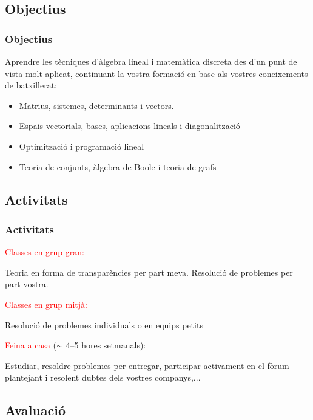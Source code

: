 \documentclass[12pt,t]{beamer}
\newcommand{\red}[1]{\textcolor{red}{#1}}
\theoremstyle{plain}
\theoremstyle{definition}
\begin{document}
\subsection{Objectius}
\begin{frame}
\frametitle{Objectius}
\medskip

Aprendre les tècniques d'àlgebra lineal i matemàtica discreta des d'un punt de vista molt aplicat, continuant la vostra formació  en base als vostres coneixements de batxillerat:
\medskip

\begin{itemize}
\item Matrius, sistemes, determinants i vectors.
\item Espais vectorials, bases, aplicacions lineals i diagonalització
\item Optimització i programació lineal
\item Teoria de conjunts, àlgebra de Boole i teoria de grafs 

\end{itemize}

\end{frame}

\subsection{Activitats}
\begin{frame}
\frametitle{Activitats}

\red{Classes en grup gran:}
\smallskip

Teoria en forma de transparències per part meva. Resolució de problemes per part vostra.\bigskip
\pause

\red{Classes en grup mitjà:}
\smallskip

Resolució de problemes individuals o en equips petits
\bigskip
\pause

\red{Feina a casa} ($\sim$ 4--5 hores setmanals):
\smallskip

Estudiar, resoldre problemes per entregar, participar activament en el fòrum plantejant i resolent dubtes dels vostres companys,...

\end{frame}


\subsection{Avaluació}
\end{document}
